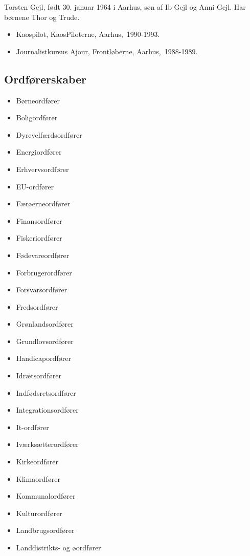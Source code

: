 \documentclass[11pt, a4paper]{awesome-cv}
\begin{document}
\makecvheader[R]
\makelettertitle
\begin{cvletter}
Torsten Gejl, født 30. januar 1964 i Aarhus, søn af Ib Gejl og Anni Gejl. Har børnene Thor og Trude.

\begin{itemize}
\item Kaospilot, KaosPiloterne, Aarhus, 1990-1993.
\item Journalistkursus Ajour, Frontløberne, Aarhus, 1988-1989.
\end{itemize}
\subsection*{Ordførerskaber}
\begin{itemize}
\item Børneordfører
\item Boligordfører
\item Dyrevelfærdsordfører
\item Energiordfører
\item Erhvervsordfører
\item EU-ordfører
\item Færøerneordfører
\item Finansordfører
\item Fiskeriordfører
\item Fødevareordfører
\item Forbrugerordfører
\item Forsvarsordfører
\item Fredsordfører
\item Grønlandsordfører
\item Grundlovsordfører
\item Handicapordfører
\item Idrætsordfører
\item Indfødsretsordfører
\item Integrationsordfører
\item It-ordfører
\item Iværksætterordfører
\item Kirkeordfører
\item Klimaordfører
\item Kommunalordfører
\item Kulturordfører
\item Landbrugsordfører
\item Landdistrikts- og øordfører

\end{itemize}
\end{cvletter}
\end{document}
